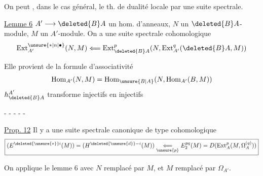On peut , dans le cas général, le th. de dualité locale par une suite spectrale.

\uline{Lemme 6} $A'\longrightarrow\deleted{B}A$ un hom. d'anneaux, $N$ un $\deleted{B}A$-module, $M$ un $A'$-module. On a une suite spectrale cohomologique
\[
\operatorname{Ext}_{A'}^{\unsure{*|n|\bullet}}(N,M)\Longleftarrow
\operatorname{Ext}_{\deleted{B}A}^{p}(N,\operatorname{Ext}_{A'}^{q}(\deleted{B}A,M))
\]

Elle provient de la formule d'associativité
\[
\operatorname{Hom}_{A'}(N,M)=\operatorname{Hom}_{\unsure{B|A}}(N,\operatorname{Hom}_{A'}(B,M))
\]
$h_{\deleted{B}A}^{A'}$ transforme injectifs en injectifs

\centerline{- - - - -}

\uline{Prop. 12}  Il y a une suite spectrale canonique de type cohomologique
\[
\boxed{(E^{\deleted{\unsure{*}}i}(M))=(H^{\deleted{\unsure{d}}-i}(M))\underset{\unsure{p}}{\Longleftarrow}
 E_2^{pq}(M)=D(\operatorname{Ext}_{A}^{p}(M,\Omega_{A}^{(q)}))}
\]

On applique le lemme 6 avec $N$\deleted{\unsure{$=$}} remplacé par $M$, et $M$ remplacé par $\Omega_{A'}$.

